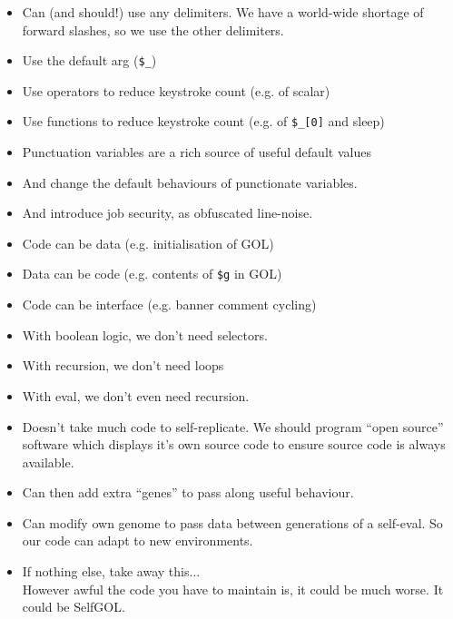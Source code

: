 \documentclass{article}
\begin{document}
\begin{itemize}
\item Can (and should!) use any delimiters.  We have a world-wide shortage of
forward slashes, so we use the other delimiters.

\item Use the default arg (\verb"$_")

\item Use operators to reduce keystroke count (e.g. of scalar)

\item Use functions to reduce keystroke count (e.g. of \verb"$_[0]" and sleep)

\item Punctuation variables are a rich source of useful default values

\item And change the default behaviours of punctionate variables.

\item And introduce job security, as obfuscated line-noise.

\item Code can be data (e.g. initialisation of GOL)

\item Data can be code
(e.g. contents of \verb"$g" in GOL)

\item Code can be interface
(e.g. banner comment cycling)

\item With boolean logic, we don't need selectors.

\item With recursion, we don't need loops

\item With eval, we don't even need recursion.

\item Doesn't take much code to self-replicate.  We should program ``open
source'' software which displays it's own source code to ensure source
code is always available.

\item Can then add extra ``genes'' to pass along useful behaviour.

\item Can modify own genome to pass data between generations of a self-eval.
So our code can adapt to new environments.

\item If nothing else, take away this...\\
However awful the code you have to maintain is, it could be much worse.
It could be SelfGOL.
\end{itemize}
\end{document}
